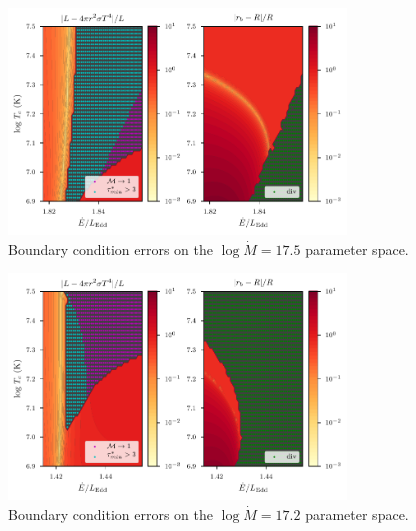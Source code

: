\documentclass[../main.tex]{subfiles}
\begin{document}
\begin{figure}[ht!]
    \centering
    \includegraphics[width=0.8\textwidth]{figures/errorspace_17_5.pdf}
    \vspace*{-0.5cm}
    \caption*{Boundary condition errors on the $\log\dot{M}=\bm{17.5}$ parameter space.}
    \label{fig:errorspace_17_5}
\end{figure}

\begin{figure}[h!]
    \centering
    \includegraphics[width=0.8\textwidth]{figures/errorspace_17_2.pdf}
    \vspace*{-0.5cm}
    \caption*{Boundary condition errors on the $\log\dot{M}=\bm{17.2}$ parameter space.}
    \label{fig:errorspace_17_2}
\end{figure}
\end{document}
